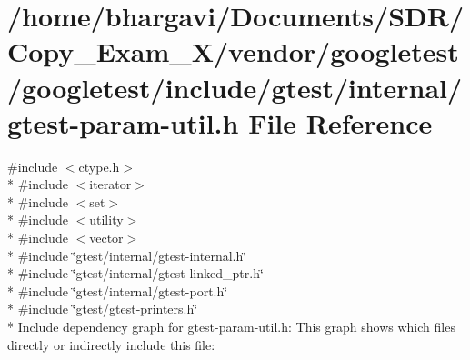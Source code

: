 \hypertarget{gtest-param-util_8h}{}\section{/home/bhargavi/\+Documents/\+S\+D\+R/\+Copy\+\_\+\+Exam\+\_\+X/vendor/googletest/googletest/include/gtest/internal/gtest-\/param-\/util.h File Reference}
\label{gtest-param-util_8h}
{\ttfamily \#include $<$ctype.\+h$>$}\\*
{\ttfamily \#include $<$iterator$>$}\\*
{\ttfamily \#include $<$set$>$}\\*
{\ttfamily \#include $<$utility$>$}\\*
{\ttfamily \#include $<$vector$>$}\\*
{\ttfamily \#include \char`\"{}gtest/internal/gtest-\/internal.\+h\char`\"{}}\\*
{\ttfamily \#include \char`\"{}gtest/internal/gtest-\/linked\+\_\+ptr.\+h\char`\"{}}\\*
{\ttfamily \#include \char`\"{}gtest/internal/gtest-\/port.\+h\char`\"{}}\\*
{\ttfamily \#include \char`\"{}gtest/gtest-\/printers.\+h\char`\"{}}\\*
Include dependency graph for gtest-\/param-\/util.h\+:
This graph shows which files directly or indirectly include this file\+:
